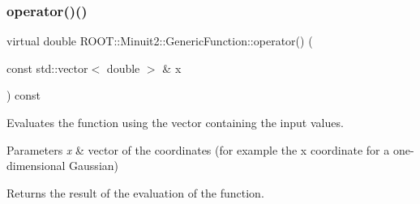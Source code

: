 \mbox{\label{classROOT_1_1Minuit2_1_1GenericFunction_a0d6039ad9aa18e475534d1fd80342e9d}} 
\subsubsection{\texorpdfstring{operator()()}{operator()()}\hspace{0.1cm}{\footnotesize\ttfamily [2/3]}}
{\footnotesize\ttfamily virtual double R\+O\+O\+T\+::\+Minuit2\+::\+Generic\+Function\+::operator() (\begin{DoxyParamCaption}\item[{const std\+::vector$<$ double $>$ \&}]{x }\end{DoxyParamCaption}) const\hspace{0.3cm}{\ttfamily [pure virtual]}}

Evaluates the function using the vector containing the input values.


\begin{DoxyParams}{Parameters}
{\em x} & vector of the coordinates (for example the x coordinate for a one-\/dimensional Gaussian)\\
\hline
\end{DoxyParams}
\begin{DoxyReturn}{Returns}
the result of the evaluation of the function. 
\end{DoxyReturn}


